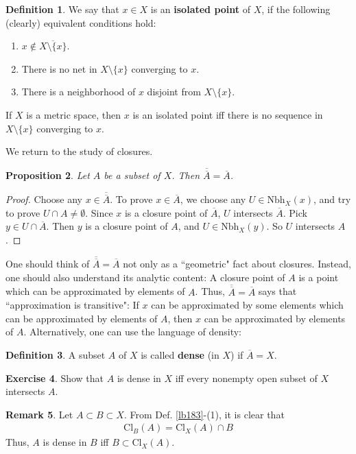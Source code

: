 \documentclass[12pt,b5paper,notitlepage]{article}
\theoremstyle{definition}
\newtheorem{df}{Definition}[section]
\newtheorem{exe}[df]{Exercise}
\newtheorem{rem}[df]{Remark}
\theoremstyle{plain}
\newtheorem{pp}[df]{Proposition}
\newcommand{\ovl}{\overline}
\newcommand{\Nbh}{\mathrm{Nbh}}
\newcommand{\Cl}{\mathrm{Cl}}
\numberwithin{equation}{section}
\begin{document}
\begin{df}
We say that $x\in X$ is an \textbf{isolated point} of $X$, if the following (clearly) equivalent conditions hold:
\begin{enumerate}[label=(\arabic*)]
\item $x\notin\ovl {X\setminus\{x\}}$.
\item There is no net in $X\setminus\{x\}$ converging to $x$.
\item There is a neighborhood of $x$ disjoint from $X\setminus\{x\}$.
\end{enumerate}
If $X$ is a metric space, then $x$ is an isolated point iff there is no sequence in $X\setminus\{x\}$ converging to $x$.
\end{df}


We return to the study of closures.

\begin{pp}\label{lb177}
Let $A$ be a subset of $X$. Then $\ovl{\ovl A}=\ovl A$.
\end{pp}

\begin{proof}
Choose any $x\in \ovl{\ovl A}$. To prove $x\in \ovl A$, we choose any  $U\in\Nbh_X(x)$, and try to prove $U\cap A\neq\emptyset$. Since $x$ is a closure point of $\ovl A$, $U$ intersects $\ovl A$. Pick $y\in U\cap\ovl A$. Then $y$ is a closure point of $A$, and $U\in\Nbh_X(y)$. So $U$ intersects $A$. 
\end{proof}


One should think of $\ovl{\ovl A}=\ovl A$ not only as a ``geometric" fact about closures. Instead, one should also understand its analytic content: A closure point of $A$ is a point which can be approximated by elements of $A$. Thus, $\ovl{\ovl A}=\ovl A$ says that ``approximation is transitive": If $x$ can be approximated by some elements which can be approximated by elements of $A$, then $x$ can be approximated by elements of $A$. Alternatively, one can use the language of density:

\begin{df}
A subset $A$ of $X$ is called \textbf{dense} (in $X$)  if $\ovl A= X$.
\end{df}

\begin{exe}
Show that $A$ is dense in $X$ iff every nonempty open subset of $X$ intersects $A$.
\end{exe}



\begin{rem}\label{lb182}
Let $A\subset B\subset X$.  From Def. \ref{lb183}-(1), it is clear that
\begin{align}
\Cl_B(A)=\Cl_X(A)\cap B \label{eq64}
\end{align}
Thus, $A$ is dense in $B$ iff $B\subset \Cl_X(A)$.
\end{rem}
\end{document}
